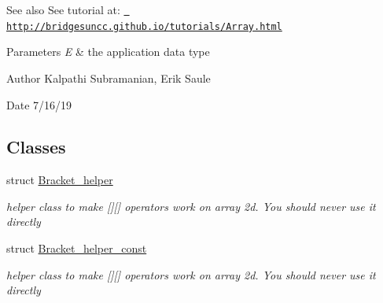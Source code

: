 \begin{DoxyCode}{0}
\end{DoxyCode}


\begin{DoxySeeAlso}{See also}
See tutorial at\+: \href{http://bridgesuncc.github.io/tutorials/Array.html}{\texttt{ http\+://bridgesuncc.\+github.\+io/tutorials/\+Array.\+html}}
\end{DoxySeeAlso}

\begin{DoxyParams}{Parameters}
{\em E} & the application data type\\
\hline
\end{DoxyParams}
\begin{DoxyAuthor}{Author}
Kalpathi Subramanian, Erik Saule 
\end{DoxyAuthor}
\begin{DoxyDate}{Date}
7/16/19 
\end{DoxyDate}
\subsection*{Classes}
\begin{DoxyCompactItemize}
\item 
struct \mbox{\hyperlink{structbridges_1_1datastructure_1_1_array2_d_1_1_bracket__helper}{Bracket\+\_\+helper}}
\begin{DoxyCompactList}\small\item\em helper class to make \mbox{[}\mbox{]}\mbox{[}\mbox{]} operators work on array 2d. You should never use it directly \end{DoxyCompactList}\item 
struct \mbox{\hyperlink{structbridges_1_1datastructure_1_1_array2_d_1_1_bracket__helper__const}{Bracket\+\_\+helper\+\_\+const}}
\begin{DoxyCompactList}\small\item\em helper class to make \mbox{[}\mbox{]}\mbox{[}\mbox{]} operators work on array 2d. You should never use it directly \end{DoxyCompactList}\end{DoxyCompactItemize}
